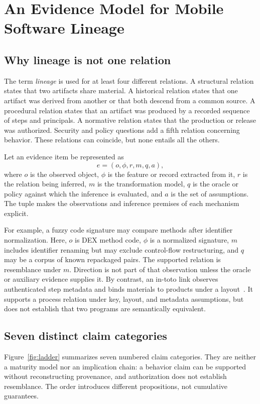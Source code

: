 \section{An Evidence Model for Mobile Software Lineage}
\label{sec:model}

\subsection{Why lineage is not one relation}

The term \emph{lineage} is used for at least four different relations. A structural relation states that two artifacts share material. A historical relation states that one artifact was derived from another or that both descend from a common source. A procedural relation states that an artifact was produced by a recorded sequence of steps and principals. A normative relation states that the production or release was authorized. Security and policy questions add a fifth relation concerning behavior. These relations can coincide, but none entails all the others.

Let an evidence item be represented as
\[
  e=(o,\phi,r,m,q,a),
\]
where $o$ is the observed object, $\phi$ is the feature or record extracted from it, $r$ is the relation being inferred, $m$ is the transformation model, $q$ is the oracle or policy against which the inference is evaluated, and $a$ is the set of assumptions. The tuple makes the observations and inference premises of each mechanism explicit.

For example, a fuzzy code signature may compare methods after identifier normalization. Here, $o$ is DEX method code, $\phi$ is a normalized signature, $m$ includes identifier renaming but may exclude control-flow restructuring, and $q$ may be a corpus of known repackaged pairs. The supported relation is resemblance under $m$. Direction is not part of that observation unless the oracle or auxiliary evidence supplies it. By contrast, an in-toto link observes authenticated step metadata and binds materials to products under a layout~\cite{intoto}. It supports a process relation under key, layout, and metadata assumptions, but does not establish that two programs are semantically equivalent.

\subsection{Seven distinct claim categories}

Figure~\ref{fig:ladder} summarizes seven numbered claim categories. They are neither a maturity model nor an implication chain: a behavior claim can be supported without reconstructing provenance, and authorization does not establish resemblance. The order introduces different propositions, not cumulative guarantees.

